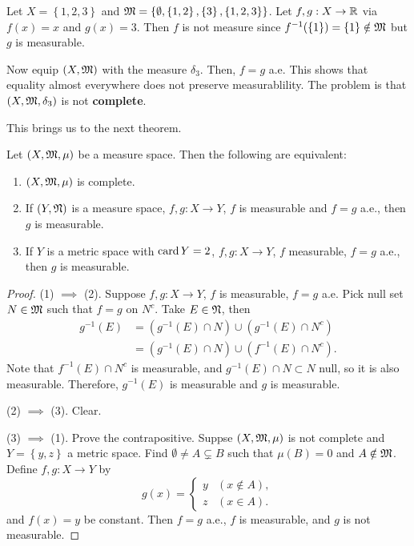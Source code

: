 \documentclass[a4paper]{article}
\begin{document}
\begin{eg}
  Let $X = \left\{ 1,2,3 \right\}$ and $\mathfrak{M} = 
  \left\{ \emptyset, \left\{ 1, 2 \right\}, 
  \left\{ 3 \right\}, \left\{ 1, 2, 3 \right\} \right\}$.
  Let $f, g: X \to \mathbb{R}$ via $f(x) = x$ and $g(x) = 3$.
  Then $f$ is not measure since $f^{-1} (\left\{ 1 \right\})
  = \left\{ 1 \right\} \notin \mathfrak{M}$ but $g$ is measurable.

  Now equip $(X, \mathfrak{M})$ with the measure $\delta_3$.
  Then, $f = g$ a.e. This shows that equality almost 
  everywhere does not preserve measurablility.
  The problem is that $(X, \mathfrak{M}, \delta_3)$ is not 
  \textbf{complete}.
\end{eg}

This brings us to the next theorem.

\begin{thm}
Let $(X, \mathfrak{M}, \mu)$ be a measure space. Then the following 
are equivalent:
\begin{enumerate}
  \item $(X, \mathfrak{M}, \mu)$ is complete. 
  \item If $(Y, \mathfrak{N})$ is a measure space, $f, g : X 
  \to Y$, $f$ is measurable and $f = g$ a.e., then 
  $g$ is measurable.
  \item If $Y$ is a metric space with $\operatorname{card} Y = 2$, 
  $f, g: X \to Y$, $f$ measurable, $f = g$ a.e., 
  then $g$ is measurable.
\end{enumerate}  
\end{thm}

\begin{proof}
  
(1) $\implies$ (2). Suppose $f, g: X \to Y$, $f$ is measurable, 
$f = g$ a.e. Pick null set $N \in \mathfrak{M}$ such that 
$f = g$ on $N^c$. Take $E \in \mathfrak{N}$, then 
\[
\begin{aligned}
  g^{-1}(E) 
  &= (g^{-1}(E) \cap N) \cup (g^{-1} (E) \cap N^c) \\
  &= (g^{-1}(E) \cap N) \cup (f^{-1} (E) \cap N^c).
\end{aligned}
\]
Note that $f^{-1}(E) \cap N^c$ is measurable, 
and $g^{-1}(E) \cap N \subset N$ null, so it is also measurable.
Therefore, $g^{-1}(E)$ is measurable and $g$ is measurable.

(2) $\implies$ (3). Clear. 

(3) $\implies$ (1). Prove the contrapositive. 
Suppse $(X, \mathfrak{M}, \mu)$ is not complete and 
$Y = \left\{ y, z \right\}$ a metric space. 
Find $\emptyset \neq A \subsetneq B$ such that 
$\mu(B) = 0$ and $A \notin \mathfrak{M}$. Define $f, g : 
X \to Y$ by 
\[
g(x) = \begin{cases}
  y & (x \notin A), \\
  z & (x \in A).
\end{cases}
\]
and $f(x) = y$ be constant. Then $f = g$ a.e., 
$f$ is measurable, and $g$ is not measurable. 

\end{proof}
\end{document}
